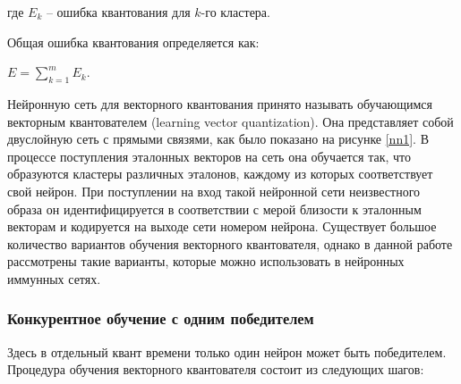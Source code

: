 \documentclass[bachelor, och, referat]{template}
\begin{document}
где $E_k$ -- ошибка квантования для $k$-го кластера.

Общая ошибка квантования определяется как:

\begin{center}
    $E = \sum_{k = 1}^{m} E_k$.
\end{center}

Нейронную сеть для векторного квантования принято называть
обучающимся векторным квантователем (learning vector quantization).
Она представляет собой двуслойную сеть с прямыми связями, как было
показано на рисунке \ref{nn1}. В процессе поступления эталонных векторов на
сеть она обучается так, что образуются кластеры различных эталонов,
каждому из которых соответствует свой нейрон. При поступлении на
вход такой нейронной сети неизвестного образа он идентифицируется
в соответствии с мерой близости к эталонным векторам и кодируется на
выходе сети номером нейрона. Существует большое количество вариантов 
обучения векторного квантователя, однако в данной работе рассмотрены такие
варианты, которые можно использовать в нейронных иммунных сетях.


\subsubsection{Конкурентное обучение с одним победителем}

Здесь в отдельный квант времени только один нейрон может быть
победителем. Процедура обучения векторного квантователя состоит из
следующих шагов:
\end{document}

